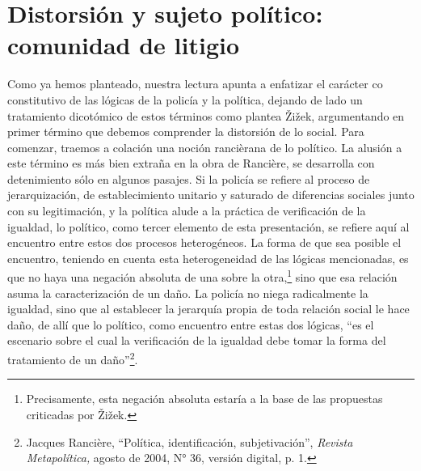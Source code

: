 \section{Distorsión y sujeto político: comunidad de litigio}

Como ya hemos planteado, nuestra lectura apunta a enfatizar el carácter co constitutivo de las lógicas de la policía y la política, dejando de lado un tratamiento dicotómico de estos términos como plantea Žižek, argumentando en primer término que debemos comprender la distorsión de lo social. Para comenzar, traemos a colación una noción rancièrana de lo político. La alusión a este término es más bien extraña en la obra de Rancière, se desarrolla con detenimiento sólo en algunos pasajes. Si la policía se refiere al proceso de jerarquización, de establecimiento unitario y saturado de diferencias sociales junto con su legitimación, y la política alude a la práctica de verificación de la igualdad, lo político, como tercer elemento de esta presentación, se refiere aquí al encuentro entre estos dos procesos heterogéneos. La forma de que sea posible el encuentro, teniendo en cuenta esta heterogeneidad de las lógicas mencionadas, es que no haya una negación absoluta de una sobre la otra,\footnote{Precisamente, esta negación absoluta estaría a la base de las propuestas criticadas por Žižek.} sino que esa relación asuma la caracterización de un daño. La policía no niega radicalmente la igualdad, sino que al establecer la jerarquía propia de toda relación social le hace daño, de allí que lo político, como encuentro entre estas dos lógicas, \enquote{es el escenario sobre el cual la verificación de la igualdad debe tomar la forma del tratamiento de un daño}\footnote{Jacques Rancière, \enquote{Política, identificación, subjetivación}, \emph{Revista Metapolítica,} agosto de 2004, N° 36, versión digital, p. 1.}.

